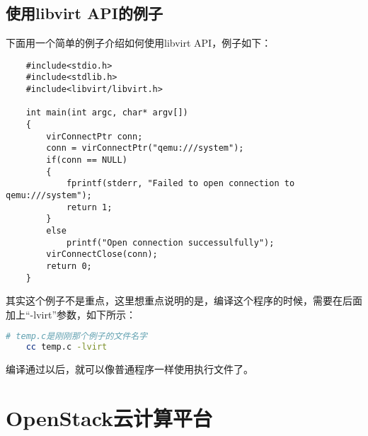 \documentclass[a4paper,left=2.5cm,right=2.5cm,11pt]{article}
\begin{document}
\subsection{使用libvirt API的例子}
	下面用一个简单的例子介绍如何使用libvirt API，例子如下：
	\begin{lstlisting}
	#include<stdio.h>
	#include<stdlib.h>
	#include<libvirt/libvirt.h>

	int main(int argc, char* argv[])
	{
		virConnectPtr conn;
		conn = virConnectPtr("qemu:///system");
		if(conn == NULL)
		{
			fprintf(stderr, "Failed to open connection to qemu:///system");
			return 1;
		}
		else
			printf("Open connection successulfully");
		virConnectClose(conn);
		return 0;
	}
	\end{lstlisting}

	其实这个例子不是重点，这里想重点说明的是，编译这个程序的时候，需要在后面加上“-lvirt”参数，如下所示：
	\begin{lstlisting}[language = bash]
	# temp.c是刚刚那个例子的文件名字
	cc temp.c -lvirt
	\end{lstlisting}

	编译通过以后，就可以像普通程序一样使用执行文件了。

\clearpage

\section{OpenStack云计算平台}
\end{document}
